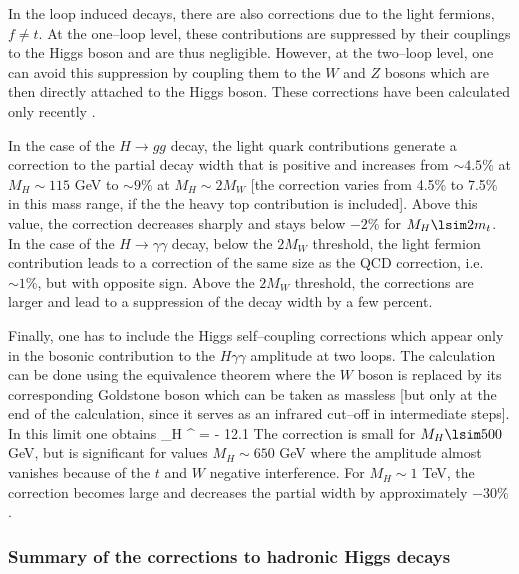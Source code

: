 In the loop induced decays, there are also corrections due to the light 
fermions, $f\neq t$. At the one--loop level, these contributions are suppressed
by their couplings to the Higgs boson and are thus negligible. However, at the
two--loop level, one can avoid this suppression by coupling them to the $W$ and
$Z$ bosons which are then directly attached to the Higgs boson. These 
corrections have been calculated only recently \cite{RCita}. \s

In the case of the $H\to gg$ decay, the light quark contributions generate a
correction to the partial decay width that is positive and increases from $\sim
4.5\%$ at $M_H \sim 115$ GeV to $\sim 9 \%$ at $M_H \sim 2M_W$ [the correction
varies from 4.5\% to 7.5\% in this mass range, if the the heavy top
contribution is included]. Above this value, the correction decreases sharply
and stays below $-2\%$ for $M_H \lsim 2m_t$. In the case of the $H \to
\gamma \gamma$ decay, below the $2M_W$ threshold, the light fermion
contribution leads to a correction of the same size as the QCD correction, i.e.
$\sim 1\%$, but with opposite sign. Above the $2M_W$ threshold, the corrections 
are larger and lead to a suppression of the decay width by a few percent. \s

Finally, one has to include the Higgs self--coupling corrections which appear 
only in the bosonic contribution to the $H\gamma\gamma$ amplitude at two loops. 
The calculation can be done using the equivalence theorem 
where the $W$ boson is replaced by its corresponding Goldstone boson which
can be taken as massless [but only at the end of the calculation, since it 
serves as an infrared cut--off in intermediate steps]. In this limit
one obtains \cite{Hpp-MH2} 
\beq
\delta_{H \gamma \gamma}^{\lambda} =  - 12.1  
\eeq
The correction is small for $M_H \lsim 500$ GeV, but is significant for 
values $M_H \sim 650$ GeV where the amplitude almost vanishes because
of the $t$ and $W$ negative interference. For $M_H \sim 1$ 
TeV, the correction becomes large and decreases the partial width by 
approximately $-30\%$. 

\subsubsection{Summary of the corrections to hadronic Higgs decays} 

